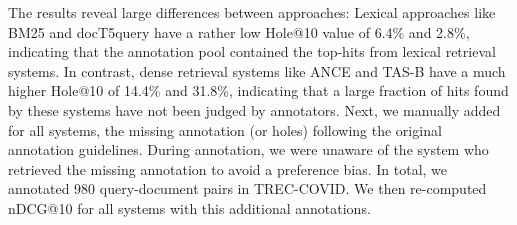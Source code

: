 \documentclass{article}
\begin{document}
\begin{table}[t!]
    \small
    \caption{Hole@10 analysis on TREC-COVID. Annotated scores show improvement in performances after removing holes@10 (documents in top-10 hits unseen by annotators) across each model. \vspace{-3mm}}
    \label{tab:hole@k}
\end{table}

The results reveal large differences between approaches: Lexical approaches like BM25 and docT5query have a rather low Hole@10 value of 6.4\% and 2.8\%, indicating that the annotation pool contained the top-hits from lexical retrieval systems. In contrast, dense retrieval systems like ANCE and TAS-B have a much higher Hole@10 of 14.4\% and 31.8\%, indicating that a large fraction of hits found by these systems have not been judged by annotators.
Next, we manually added for all systems, the missing annotation (or holes) following the original annotation guidelines. During annotation, we were unaware of the system who retrieved the missing annotation to avoid a preference bias. In total, we annotated 980 query-document pairs in TREC-COVID. We then re-computed nDCG@10 for all systems with this additional annotations.
\end{document}
